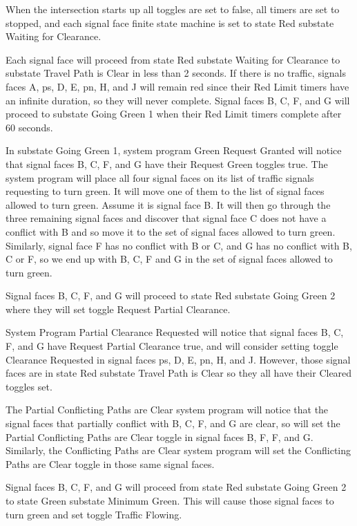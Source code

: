 \documentclass[letterpaper,twoside]{article}
\begin{document}
When the intersection starts up all toggles are set to false,
all timers are set to stopped, and each signal face finite state machine
is set to state Red substate Waiting for Clearance.

Each signal face will proceed
from state Red substate Waiting for Clearance to substate Travel Path is Clear
in less than 2 seconds.
If there is no traffic, signals faces A, ps, D, E, pn, H, and J will remain red
since their Red Limit timers have an infinite duration, so they will never
complete.
Signal faces B, C, F, and G will proceed to substate Going Green 1 when
their Red Limit timers complete after 60 seconds.

In substate Going Green 1, system program Green Request Granted will notice
that signal faces B, C, F, and G have their Request Green toggles true.
The system program will place all four signal faces on its list of traffic
signals requesting to turn green.  It will move one of them to the list
of signal faces allowed to turn green.  Assume it is signal face B.
It will then go through the three
remaining signal faces and discover that signal face C does not have
a conflict with B and so move it to the set of signal faces allowed
to turn green.  Similarly, signal face F has no conflict with B or C,
and G has no conflict with B, C or F, so we end up with B, C, F and G
in the set of signal faces allowed to turn green.

Signal faces B, C, F, and G will proceed to state Red
substate Going Green 2 where they will set toggle Request Partial Clearance.

System Program Partial Clearance Requested will notice that signal faces
B, C, F, and G have Request Partial Clearance true,
and will consider setting toggle Clearance
Requested in signal faces ps, D, E, pn, H, and J.  However, those signal faces
are in state Red substate Travel Path is Clear so they all have their
Cleared toggles set.

The Partial Conflicting Paths are Clear system program will notice that the
signal faces that partially conflict with B, C, F, and G are clear,
so will set the
Partial Conflicting Paths are Clear toggle in signal faces B, F, F, and G.
Similarly, the Conflicting Paths are Clear system program will set
the Conflicting Paths are Clear toggle in those same signal faces.

Signal faces B, C, F, and G will proceed from state Red substate
Going Green 2 to state Green substate Minimum Green.
This will cause those signal faces to turn green and set toggle
Traffic Flowing.
\end{document}

